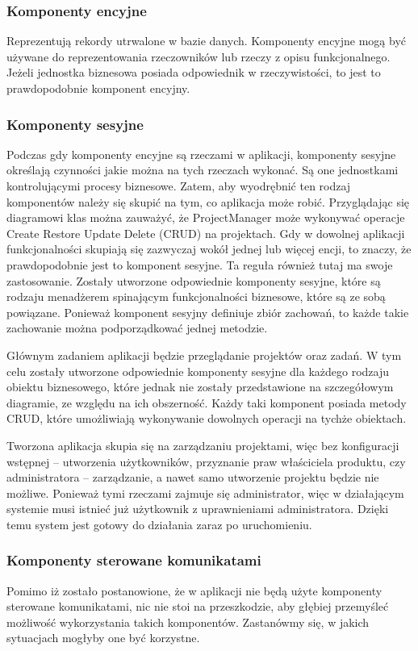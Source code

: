 \subsubsection{Komponenty encyjne}
Reprezentują rekordy utrwalone w bazie danych. Komponenty encyjne mogą być używane do reprezentowania rzeczowników lub rzeczy z opisu funkcjonalnego. Jeżeli jednostka biznesowa posiada odpowiednik w rzeczywistości, to jest to prawdopodobnie komponent encyjny.

\subsubsection{Komponenty sesyjne}
Podczas gdy komponenty encyjne są rzeczami w aplikacji, komponenty sesyjne określają czynności jakie można na tych rzeczach wykonać. Są one jednostkami kontrolującymi procesy biznesowe. Zatem, aby wyodrębnić ten rodzaj komponentów należy się skupić na tym, co aplikacja może robić.
Przyglądając się diagramowi klas można zauważyć, że ProjectManager może wykonywać operacje Create Restore Update Delete (CRUD) na projektach.
Gdy w dowolnej aplikacji funkcjonalności skupiają się zazwyczaj wokół jednej lub więcej encji, to znaczy, że prawdopodobnie jest to komponent sesyjne. Ta reguła również tutaj ma swoje zastosowanie. Zostały utworzone odpowiednie komponenty sesyjne, które są rodzaju menadżerem spinającym funkcjonalności biznesowe, które są ze sobą powiązane. Ponieważ komponent sesyjny definiuje zbiór zachowań, to każde takie zachowanie można podporządkować jednej metodzie.

Głównym zadaniem aplikacji będzie przeglądanie projektów oraz zadań. W tym celu zostały utworzone odpowiednie komponenty sesyjne dla każdego rodzaju obiektu biznesowego, które jednak nie zostały przedstawione na szczegółowym diagramie, ze względu na ich obszerność. Każdy taki komponent posiada metody CRUD, które umożliwiają wykonywanie dowolnych operacji na tychże obiektach.

Tworzona aplikacja skupia się na zarządzaniu projektami, więc bez konfiguracji wstępnej – utworzenia użytkowników, przyznanie praw właściciela produktu, czy administratora  – zarządzanie, a nawet samo utworzenie projektu będzie nie możliwe. Ponieważ tymi rzeczami zajmuje się administrator, więc w działającym systemie musi istnieć już użytkownik z uprawnieniami administratora. Dzięki temu system jest gotowy do działania zaraz po uruchomieniu.

\subsubsection{Komponenty sterowane komunikatami}
Pomimo iż zostało postanowione, że w aplikacji nie będą użyte komponenty sterowane komunikatami, nic nie stoi na przeszkodzie, aby głębiej przemyśleć możliwość wykorzystania takich komponentów. Zastanówmy się, w jakich sytuacjach mogłyby one być korzystne.

